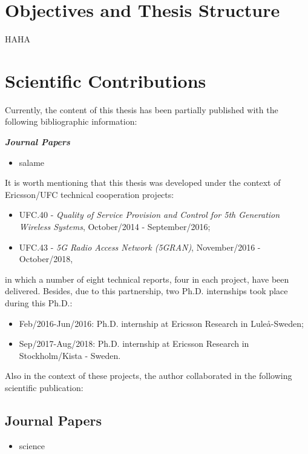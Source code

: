 \section{Objectives and Thesis Structure}
HAHA

\section{Scientific Contributions}
\begin{refsection}

Currently, the content of this thesis has been partially published with the following bibliographic information: %

\noindent\textit{\textbf{Journal Papers}}
\begin{itemize}
	\item salame
\end{itemize}

It is worth mentioning that this thesis was developed under the context of Ericsson/UFC technical cooperation projects:
\begin{itemize}
	\item UFC.40 - \textit{Quality of Service Provision and Control for 5th Generation Wireless Systems}, October/2014 - September/2016;
	\item UFC.43 - \textit{5G Radio Access Network (5GRAN)}, November/2016 - October/2018,
\end{itemize}
in which a number of eight technical reports, four in each project, have been delivered. %
Besides, due to this partnership, two Ph.D. internships took place during this Ph.D.:
\begin{itemize}
	\item Feb/2016-Jun/2016: Ph.D. internship at Ericsson Research in Lule\aa -Sweden;
	\item Sep/2017-Aug/2018: Ph.D. internship at Ericsson Research in Stockholm/Kista - Sweden.
\end{itemize}

Also in the context of these projects, the author collaborated in the following scientific publication:

\subsection*{Journal Papers}
\begin{itemize}
    \item science
\end{itemize}

\end{refsection}
